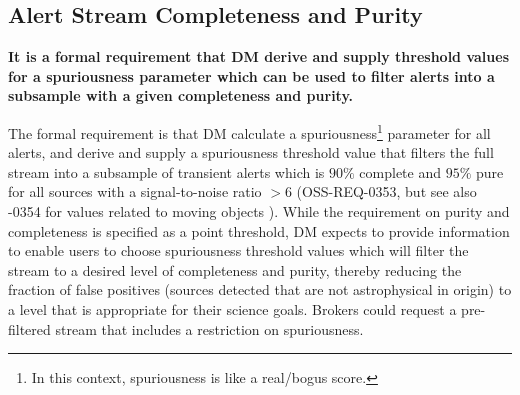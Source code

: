 \documentclass[DM,authoryear,toc]{lsstdoc}
\begin{document}


\subsection{Alert Stream Completeness and Purity}\label{ssec:comp_pure}

{\bf It is a formal requirement that DM derive and supply threshold values for a spuriousness parameter which can be used to filter alerts into a subsample with a given completeness and purity.}

The formal requirement is that DM calculate a spuriousness\footnote{In this context, spuriousness is like a real/bogus score.} parameter for all alerts, and derive and supply a spuriousness threshold value that filters the full stream into a subsample of transient alerts which is $90\%$ complete and $95\%$ pure for all sources with a signal-to-noise ratio $>6$ (OSS-REQ-0353, but see also -0354 for values related to moving objects ). While the requirement on purity and completeness is specified as a point threshold, DM expects to provide information to enable users to choose spuriousness threshold values which will filter the stream to a desired level of completeness and purity, thereby reducing the fraction of false positives (sources detected that are not astrophysical in origin) to a level that is appropriate for their science goals. Brokers could request a pre-filtered stream that includes a restriction on spuriousness.
\end{document}
